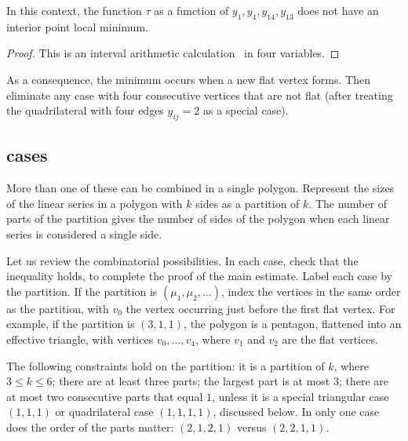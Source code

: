 \begin{lemma}
In this context, the function $\tau$ as a function of $y_1,y_4,y_{14},y_{13}$ does not have an interior point local minimum.
\end{lemma}
%

\begin{proof} This is an interval arithmetic calculation~\cite[cc:qua]{hales:2009:nonlinear} in four variables.%
\end{proof}

As a consequence, the minimum occurs when a new flat vertex forms.   Then eliminate any case with four consecutive vertices that are not flat (after treating the quadrilateral with four edges $y_{ij}=2$ as a special case).

\subsection{cases}

More than one of these can be combined in a single polygon.   Represent the sizes of the linear series in a polygon with $k$ sides as a partition of $k$.
The number of parts of the partition gives the number of sides of the polygon when each linear series is considered a single side. 
%

Let us review the combinatorial possibilities.  In each case,  check that the inequality holds, to complete the proof of the main estimate.  Label each 
case by the partition.  If the partition is $(\mu_1,\mu_2,\ldots)$, 
index the vertices in the same order as the partition, with $v_0$
the vertex occurring just before the first flat vertex.  For example,
if the partition is $(3,1,1)$, the polygon is a pentagon, flattened into
an effective triangle, with vertices $v_0,\ldots,v_4$, where $v_1$ and $v_2$
are the flat vertices.
%

The following constraints hold on the partition: it is
a partition of $k$, where $3\le k\le 6$; there
are at least three parts; the largest part is at most $3$;  there are
at most two consecutive parts that equal $1$, unless it is a special triangular case $(1,1,1)$ or
quadrilateral case $(1,1,1,1)$, discussed below.  In only one case
does the order of the parts matter: $(2,1,2,1)$ versus $(2,2,1,1)$.

